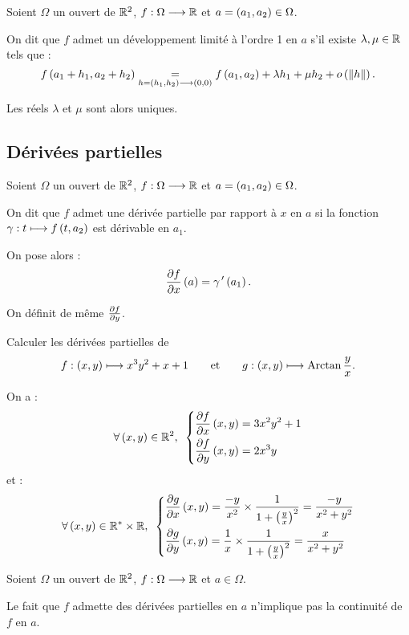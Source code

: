 \begin{defi}
Soient \(\Omega\) un ouvert de \(\mathbb{R}^2\), \(f:\Omega\longrightarrow\mathbb{R}\) et \(a=\left(a_1,a_2\right)\in\Omega\).

On dit que \(f\) admet un développement limité à l'ordre 1 en \(a\) s'il existe \(\lambda,\mu\in\mathbb{R}\) tels que : \[f\left(a_1+h_1,a_2+h_2\right)\underset{h=\left(h_1,h_2\right)\longrightarrow\left(0,0\right)}{=}f\left(a_1,a_2\right)+\lambda h_1+\mu h_2+o\left(\left\|h\right\|\right).\]

Les réels \(\lambda\) et \(\mu\) sont alors uniques.
\end{defi}

\subsection{Dérivées partielles}

\begin{defi}
Soient \(\Omega\) un ouvert de \(\mathbb{R}^2\), \(f:\Omega\longrightarrow\mathbb{R}\) et \(a=\left(a_1,a_2\right)\in\Omega\).

On dit que \(f\) admet une dérivée partielle par rapport à \(x\) en \(a\) si la fonction \(\gamma:t\longmapsto f\left(t,a_2\right)\) est dérivable en \(a_1\).

On pose alors : \[\pdv{f}{x}\left(a\right)=\gamma^{\,\prime}\left(a_1\right).\]

On définit de même \(\pdv{f}{y}\).
\end{defi}


\begin{exoex}
Calculer les dérivées partielles de \[f:\left(x,y\right)\longmapsto x^3y^2+x+1\qquad\text{et}\qquad g:\left(x,y\right)\longmapsto\operatorname{Arctan}\dfrac{y}{x}.\]
\end{exoex}


\begin{corr}
On a : \[\quantifs{\forall\paren{x,y}\in\R^2}\begin{dcases}
\pdv{f}{x}\paren{x,y}=3x^2y^2+1 \\
\pdv{f}{y}\paren{x,y}=2x^3y
\end{dcases}\] et : \[\quantifs{\forall\paren{x,y}\in\Rs\times\R}\begin{dcases}
\pdv{g}{x}\paren{x,y}=\dfrac{-y}{x^2}\times\dfrac{1}{1+\paren{\frac{y}{x}}^2}=\dfrac{-y}{x^2+y^2} \\
\pdv{g}{y}\paren{x,y}=\dfrac{1}{x}\times\dfrac{1}{1+\paren{\frac{y}{x}}^2}=\dfrac{x}{x^2+y^2}
\end{dcases}\]
\end{corr}


\begin{rem}
Soient \(\Omega\) un ouvert de \(\mathbb{R}^2\), \(f:\Omega\longrightarrow\mathbb{R}\) et \(a\in\Omega\).

Le fait que \(f\) admette des dérivées partielles en \(a\) n'implique pas la continuité de \(f\) en \(a\).
\end{rem}

